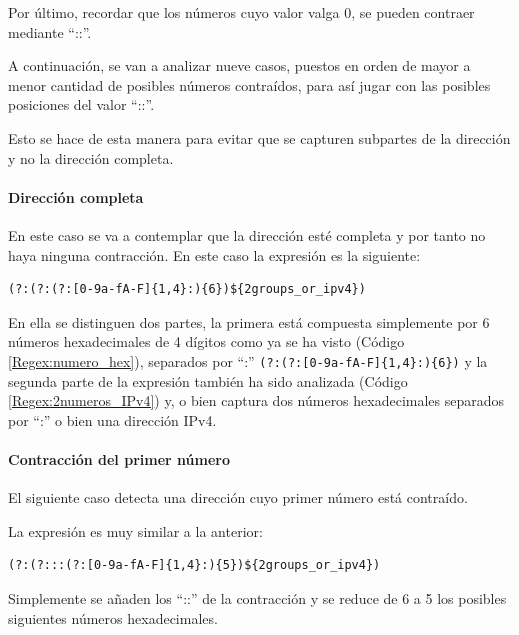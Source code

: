 Por último, recordar que los números cuyo valor valga 0, se pueden contraer mediante “::”.

A continuación, se van a analizar nueve casos, puestos en orden de mayor a menor cantidad de posibles números contraídos, para así jugar con las posibles posiciones del valor “::”.

Esto se hace de esta manera para evitar que se capturen subpartes de la dirección y no la dirección completa.

\paragraph{Dirección completa}
En este caso se va a contemplar que la dirección esté completa y por tanto no haya ninguna contracción. 
En este caso la expresión es la siguiente: 

\begin{lstlisting}[breaklines, caption={Expresión regular para capturar dirección IPv6 completa}, label={Regex:ipv5_completa}, captionpos=b]
  (?:(?:(?:[0-9a-fA-F]{1,4}:){6})${2groups_or_ipv4})
 \end{lstlisting}

En ella se distinguen dos partes, la primera está compuesta simplemente por 6 números hexadecimales de 4 dígitos como ya se ha visto (Código \ref{Regex:numero_hex}), separados por “:” \verb!(?:(?:[0-9a-fA-F]{1,4}:){6})! y la segunda parte de la expresión también ha sido analizada (Código \ref{Regex:2numeros_IPv4}) y, o bien captura dos números hexadecimales separados por “:” o bien una dirección IPv4.

\paragraph{Contracción del primer número}

El siguiente caso detecta una dirección cuyo primer número está contraído. 

La expresión es muy similar a la anterior:

\begin{lstlisting}[breaklines, caption={Expresión regular para capturar dirección IPv6 con el primer número contraido}, label={Regex:ipv6_1}, captionpos=b]
   (?:(?:::(?:[0-9a-fA-F]{1,4}:){5})${2groups_or_ipv4})
\end{lstlisting}

Simplemente se añaden los “::” de la contracción y se reduce de 6 a 5 los posibles siguientes números hexadecimales.

